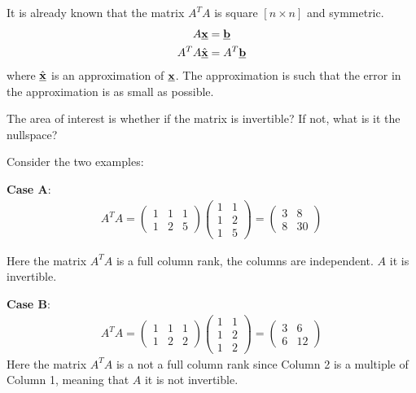 \documentclass[10pt,a4paper]{article}
\begin{document}
It is already known that the matrix $A^T A$ is square $[n \times n]$ and symmetric. 
\begin{align*}
    A \textbf{\underline{x}} &= \textbf{\underline{b}} \\
    A^T A \hat{\textbf{\underline{x}}} &= A^T \textbf{\underline{b}}
\end{align*}
where $\hat{\textbf{\underline{x}}}$ is an approximation of $\textbf{\underline{x}}$. The
approximation is such that the error in the approximation is as small as possible.

The area of interest is whether if the matrix is invertible? If not, what is it the nullspace? 

Consider the two examples:

\textbf{Case A}: 
\begin{align*}
    A^T A = \begin{pmatrix}
        1&1&1\\
        1&2&5
    \end{pmatrix} \begin{pmatrix}
        1&1\\
        1&2\\
        1&5
    \end{pmatrix} = \begin{pmatrix}
        3&8\\
        8&30
    \end{pmatrix}
\end{align*}

Here the matrix $A^TA$ is a full column rank, the columns are independent. $A$ it is invertible.

\textbf{Case B}:
\begin{align*}
    A^T A = \begin{pmatrix}
        1&1&1\\
        1&2&2
    \end{pmatrix} \begin{pmatrix}
        1&1\\
        1&2\\
        1&2
    \end{pmatrix} = \begin{pmatrix}
        3&6\\
        6&12
    \end{pmatrix}
\end{align*}
Here the matrix $A^TA$ is a not a full column rank since Column 2 is a multiple of Column 1, meaning that $A$ it is not invertible.
\end{document}
